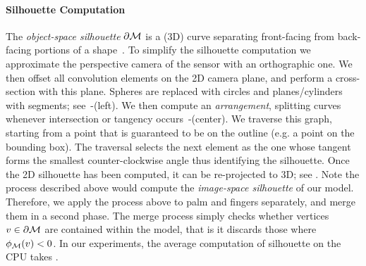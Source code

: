 \paragraph{Silhouette Computation}
The \emph{object-space silhouette} $\partial \mathcal{M}$ is a (3D) curve separating front-facing from back-facing portions of a shape~\cite[Sec.1]{olson2006eg}. To simplify the silhouette computation we approximate the perspective camera of the sensor with an orthographic one. We then offset all convolution elements on the 2D camera plane, and perform a cross-section with this plane. Spheres are replaced with circles and planes/cylinders with segments; see~-(left). We then compute an \emph{arrangement}, splitting curves whenever intersection or tangency occurs~-(center). We traverse this graph, starting from a point that is guaranteed to be on the outline (e.g. a point on the bounding box). The traversal selects the next element as the one whose tangent forms the smallest counter-clockwise angle thus identifying the silhouette. Once the 2D silhouette has been computed, it can be re-projected to 3D; see . Note the process described above would compute the \emph{image-space silhouette} of our model. Therefore, we apply the process above to palm and fingers separately, and merge them in a second phase.   The merge process simply checks whether vertices $v \in \partial \mathcal{M}$ are contained within the model, that is it discards those where $\phi_{\mathcal{M}}(v)<0$. In our experiments, the average computation of silhouette on the CPU takes .



